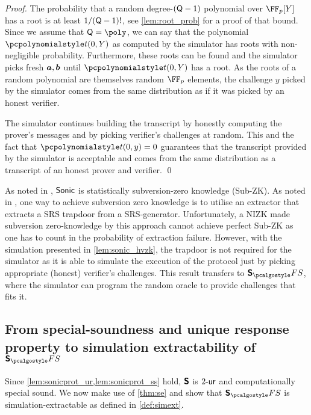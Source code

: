 \documentclass[runningheads,11pt]{llncs}
\def\vec#1{\mathchoice{\mbox{\boldmath$\displaystyle#1$}}
{\mbox{\boldmath$\textstyle#1$}} {\mbox{\boldmath$\scriptstyle#1$}}
{\mbox{\boldmath$\scriptscriptstyle#1$}}}
\theoremstyle{definition} \newtheorem{definition}[theorem]{Definition}
\begin{document}
\begin{proof}
The probability that a random degree-$(\mathsf{Q} - 1)$ polynomial over
$\FF_p[Y]$ has a root is at least $1 / (\mathsf{Q} - 1) !$, see
\cref{lem:root_prob} for a proof of that bound. Since we assume that $\linconstr
= \poly$, we can say that the polynomial $\pt(0,Y)$ as computed by the simulator
has roots with non-negligible probability. Furthermore, these roots can be found
and the simulator picks fresh $\vec{a}, \vec{b}$ until $\pt(0,Y)$ has a root. As
the roots of a random polynomial are themselves random $\FF_p$ elements, the
challenge $y$ picked by the simulator comes from the same distribution as if it
was picked by an honest verifier.

The simulator continues building the transcript by honestly computing the
prover's messages and by picking verifier's challenges at random. This and the
fact that $\pt(0,y) = 0$ guarantees that the transcript provided by the simulator is
acceptable and comes from the same distribution as a transcript of an honest
prover and verifier. \qed
\end{proof}

\begin{remark} 
  As noted in \cite{CCS:MBKM19}, ${\textnormal{\textsf{Sonic}}}$ is statistically subversion-zero
  knowledge (Sub-ZK). As noted in \cite{AC:ABLZ17}, one way to achieve
  subversion zero knowledge is to utilise an extractor that extracts a SRS
  trapdoor from a SRS-generator. Unfortunately, a NIZK made subversion
  zero-knowledge by this approach cannot achieve perfect Sub-ZK as one has to
  count in the probability of extraction failure. However, with the simulation
  presented in \cref{lem:sonic_hvzk}, the trapdoor is not required for the
  simulator as it is able to simulate the execution of the protocol just by
  picking appropriate (honest) verifier's challenges. This result transfers to
  $\sonicprotfs$, where the simulator can program the random oracle to provide
  challenges that fits it.
\end{remark}

\subsection{From special-soundness and unique response property to simulation extractability of $\sonicprotfs$}
Since \cref{lem:sonicprot_ur,lem:sonicprot_ss} hold, $\bm{\mathsf{S}}$ is ${2\text{-}\mathsf{ur}}$
and computationally special sound. We now make use
of \cref{thm:se} and show that $\sonicprotfs$ is simulation-extractable as defined in \cref{def:simext}.
\end{document}
